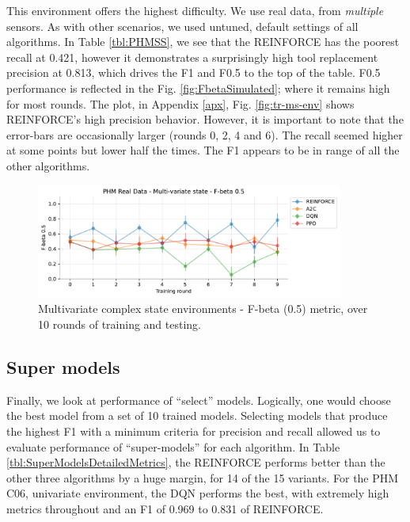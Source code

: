 \documentclass[a4paper, 12pt]{article}
\begin{document}
This environment offers the highest difficulty. We use real data, from \textit{multiple} sensors. As with other scenarios, we used untuned, default settings of all algorithms. In Table \ref{tbl:PHMSS}, we see that the REINFORCE has the poorest recall at 0.421, however it demonstrates a surprisingly high tool replacement precision at 0.813, which drives the F1 and F0.5 to the top of the table. F0.5 performance is reflected in the Fig. \ref{fig:FbetaSimulated}; where it remains high for most rounds. The plot, in Appendix \ref{apx}, Fig. \ref{fig:tr-ms-env} shows REINFORCE's high precision behavior. However, it is important to note that the error-bars are occasionally larger (rounds 0, 2, 4 and 6). The recall seemed higher at some points but lower half the times. The F1 appears to be in range of all the other algorithms.
\begin{figure}[h]
	\centering
	\includegraphics[width=0.9\textwidth]{Multivariate_F05.pdf}  
	\caption{Multivariate complex state environments - F-beta (0.5) metric, over 10 rounds of training and testing.}
	\label{fig:FbetaPHMMS}
\end{figure}

\subsection{Super models}
Finally, we look at performance of ``select'' models. Logically, one would choose the best model from a set of 10 trained models. Selecting models that produce the highest F1 with a minimum criteria for precision and recall allowed us to evaluate performance of ``super-models'' for each algorithm. In Table \ref{tbl:SuperModelsDetailedMetrics}, the REINFORCE performs better than the other three algorithms by a huge margin, for 14 of the 15 variants. For the PHM C06, univariate environment, the DQN performs the best, with extremely high metrics throughout and an F1 of 0.969 to 0.831 of REINFORCE.
\end{document}
